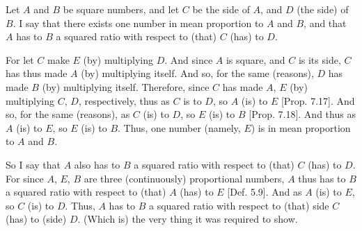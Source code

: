 \begin{Parallel}{}{}
{\epsfysize=1.2in
\centerline{}

Let $A$ and $B$ be square numbers, and let $C$ be the side of $A$, and
$D$ (the side) of $B$. I say that there exists one number in mean proportion
to $A$ and $B$, and that $A$ has to $B$ a squared ratio with respect to
(that) $C$ (has) to $D$.

For let $C$ make $E$ (by) multiplying $D$. And since $A$ is square, and $C$ is its side, $C$ has thus made $A$ (by) multiplying
itself. And so, for the same (reasons), $D$ has made $B$ (by) multiplying
itself. Therefore, since $C$ has made  $A$, $E$ (by) multiplying
$C$, $D$, respectively, thus as $C$ is to $D$, so $A$ (is) to $E$ [Prop. 7.17]. And so, for the same (reasons), 
as $C$ (is) to $D$, so $E$ (is) to $B$  [Prop. 7.18]. And thus as $A$ (is) to $E$, so
$E$ (is) to $B$. Thus,  one  number (namely, $E$) is in mean proportion to $A$ and $B$.

So I say that $A$ also has to $B$ a squared ratio with respect to (that)
$C$ (has) to $D$. For since $A$, $E$, $B$ are  three (continuously) proportional numbers, $A$ thus has to $B$ a squared ratio with
respect to (that) $A$ (has) to $E$ [Def. 5.9]. And
as $A$ (is) to $E$, so $C$ (is) to $D$. Thus, $A$ has to $B$ a squared ratio
with respect to (that) side $C$ (has) to (side) $D$. (Which is) the very thing it
was required to show.}
\end{Parallel}


\vspace{7pt}{\footnotesize\noindent$^\dag$ In other words, between two given square numbers there
exists a number in continued proportion.\\[0.5ex]
$^\ddag$ Literally, ``double''.}

